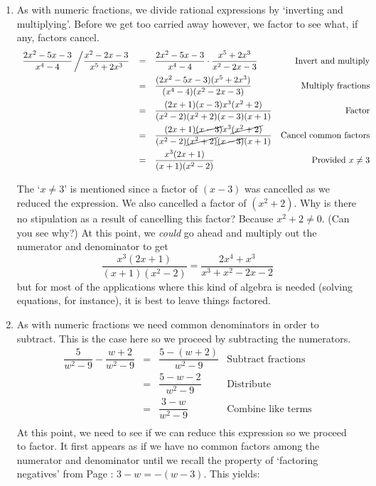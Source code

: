 \documentclass[10pt]{article}
\begin{document}
\begin{ex}
\begin{enumerate}
\item As with numeric fractions, we divide rational expressions by `inverting and multiplying'.  Before we get too carried away however, we factor to see what, if any, factors cancel.\[ \begin{array}{rclr}

\dfrac{2x^2-5x-3}{x^4 - 4} \left/ \dfrac{x^2-2x-3}{x^5 + 2x^3}\right. & = & \dfrac{2x^2-5x-3}{x^4 - 4} \cdot \dfrac{x^5 + 2x^3}{x^2-2x-3} & \text{Invert and multiply} \\ [10pt]

& = & \dfrac{(2x^2-5x-3)(x^5 + 2x^3)}{(x^4 - 4)(x^2-2x-3)} & \text{Multiply fractions}  \\ [10pt]

& = & \dfrac{(2x+1)(x-3)x^3(x^2+2)}{(x^2-2)(x^2+2)(x-3)(x+1)} & \text{Factor} \\ [10pt]

& = & \dfrac{(2x+1)\cancel{(x-3)}x^3\cancel{(x^2+2)}}{(x^2-2)\cancel{(x^2+2)}\cancel{(x-3)}(x+1)} & \text{Cancel common factors} \\ [10pt]

& = & \dfrac{x^3(2x+1)}{(x+1)(x^2-2)} & \text{Provided $x \neq 3$} \\

\end{array}\]

The `$x \neq 3$' is mentioned since a factor of $(x-3)$ was cancelled as we reduced the expression.  We also cancelled a factor of $(x^2+2)$.  Why is there no stipulation as a result of cancelling this factor? Because $x^2 + 2 \neq 0$.  (Can you see why?)  At this point, we \textit{could} go ahead and multiply out the numerator and denominator to get \[\dfrac{x^3(2x+1)}{(x+1)(x^2-2)}  = \dfrac{2x^4 + x^3}{x^3+x^2-2x-2}\] but for most of the applications where this kind of algebra is needed (solving equations, for instance), it is best to leave things factored. 

\item  As with numeric fractions we need common denominators in order to subtract.  This is the case here so we proceed by subtracting the numerators. \[ \begin{array}{rclr}

\dfrac{5}{w^2 - 9} - \dfrac{w+2}{w^2-9} & = & \dfrac{5 - (w+2)}{w^2 - 9}& \text{Subtract fractions}\\ [8pt]
                                        & = & \dfrac{5 - w - 2}{w^2-9} & \text{Distribute} \\ [8pt]
																				& = & \dfrac{3-w}{w^2-9} & \text{Combine like terms} \\ \end{array}\]
At this point, we need to see if we can reduce this expression so we proceed to factor.  It first appears as if we have no common factors among the numerator and denominator until we recall the property of `factoring negatives' from Page \pageref{propertiesofnegatives}:  $3-w = -(w-3)$. This yields:\[ \begin{array}{rclr}


\end{array}\]
\end{enumerate}
\end{ex}
\end{document}
